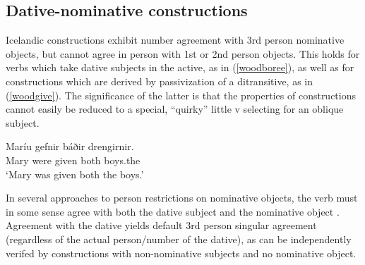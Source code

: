 \documentclass[output=paper]{langscibook}
\begin{document}
\subsection{Dative-nominative constructions} \label{wooddativ}

Icelandic \datnomn{} constructions exhibit number agreement with 3rd person nominative objects, but cannot agree in person with 1st or 2nd person objects. This holds for verbs which  take dative subjects in the active, as in (\ref{woodboree}), as well as for \datnom constructions which are derived by passivization of a ditransitive, as in (\ref{woodgive}). The significance of the latter is that the properties of \datnom constructions cannot easily be reduced to a special, “quirky” little v selecting for an oblique subject.\largerpage

\ea \label{woodboree}
\z
\ex \label{woodgive}
\ea[]%
{
    \gll Maríu  gefnir báðir drengirnir. \\
        Mary\dat{} were given both boys.the\nom{} \\
    \glt `Mary was given both the boys.'
}
\z
\z

\begin{sloppypar}
In several approaches to person restrictions on nominative objects, the verb must in some sense agree with both the dative subject and the nominative object  \citep{Boeckx:2000kf,Schutze:2003mh,Koopman:2006zp,SigurTHsson:2008dm,Ussery:2009jd}. Agreement with the dative yields default 3rd person singular agreement (regardless of the actual person/number of the dative), as can be independently verifed by constructions with non-nominative subjects and no nominative object.\end{sloppypar}
\end{document}
